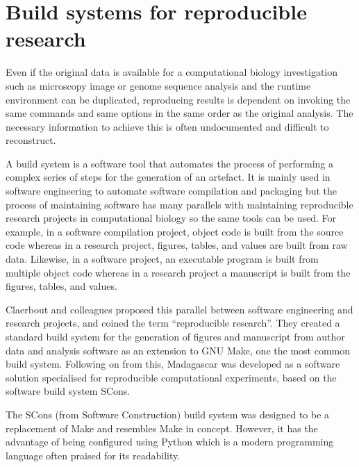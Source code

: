 \section{Build systems for reproducible research}

Even if the original data is available for a computational biology
investigation such as microscopy image or genome sequence analysis
and the runtime environment can be duplicated, reproducing results
is dependent on invoking the same commands and same
options in the same order as the original analysis.
The necessary information to achieve this is often undocumented
and difficult to reconstruct.

A build system is a software tool that automates the process of
performing a complex series of steps for the generation of an artefact.
It is mainly used in software engineering to automate software
compilation and packaging
but the process of maintaining software has many parallels with
maintaining reproducible research projects in computational biology
so the same tools
can be used.  For example,
in a software compilation project, object code is built from the
source code whereas in a research project, figures, tables, and values
are built from raw
data.  Likewise,
in a software project, an executable program is built from multiple
object code whereas in a research project a manuscript is built from the
figures, tables, and values.

Claerbout and colleagues \citep{Claerbout2000} proposed this
parallel between software engineering and research projects, and
coined the term ``reproducible research''.  They created a standard
build system for the generation of figures and manuscript from author
data and analysis software as an extension to GNU
Make, one the most common build system.  Following on from this,
Madagascar \citep{madagascar-scons} was developed as a
software solution specialised
for reproducible computational experiments, based on the software
build system SCons.

The SCons (from Software Construction) build
system \citep{SCons2005} was designed to be a
replacement of Make and resembles Make in concept.  However, it has
the advantage of being configured using Python which is a modern
programming language often praised for its readability.

